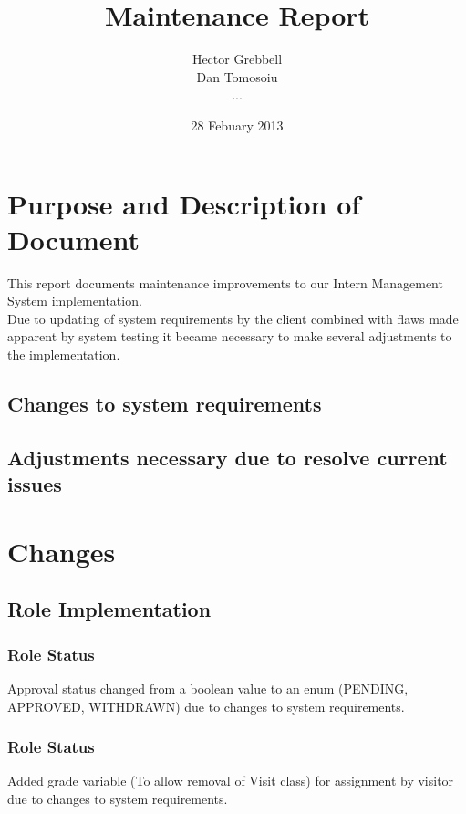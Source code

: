 \documentclass{l3deliverable}
\title{Maintenance Report}
\author{Hector Grebbell \\
        Dan Tomosoiu \\
        ...}
\date{28 Febuary 2013}
\begin{document}

\maketitle

\tableofcontents

\newpage


\section{Purpose and Description of Document}
This report documents maintenance improvements to our Intern Management System implementation. \\
Due to updating of system requirements by the client combined with flaws made apparent by system testing it became necessary to make several adjustments to the implementation.\\

\subsection{Changes to system requirements}


\subsection{Adjustments necessary due to resolve current issues}

\section{Changes}

\subsection{Role Implementation}

\subsubsection{Role Status}
Approval status changed from a boolean value to an enum (PENDING, APPROVED, WITHDRAWN) due to changes to system requirements.

\subsubsection{Role Status}
Added grade variable (To allow removal of Visit class) for assignment by visitor due to changes to system requirements.
\end{document}
